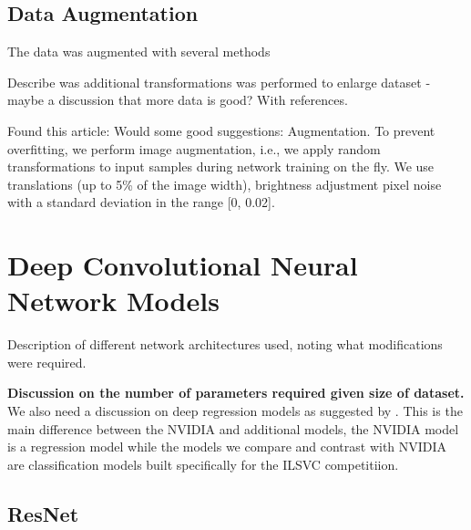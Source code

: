 \subsection{Data Augmentation}
The data was augmented with several methods

Describe was additional transformations was performed to enlarge dataset - maybe a discussion that more data is good? With references.


Found this article:
Would some good suggestions:  
Augmentation. To prevent overfitting, we perform image augmentation, i.e., we
apply random transformations to input samples during network training on the
fly. We use translations (up to 5\% of the image width), brightness adjustment
pixel noise with a standard deviation in the range [0, 0.02].
  
\section{Deep Convolutional Neural Network Models}

Description of different network architectures used, noting what modifications were required.  

\textbf{Discussion on the number of parameters required given size of dataset.}  
We also need a discussion on deep regression models as suggested by \cite{lathuilire2018comprehensive}. This is the main difference between the NVIDIA and additional models, the NVIDIA model is a regression model while the models we compare and contrast with NVIDIA are classification models built specifically for the ILSVC  competitiion.

\subsection{ResNet}

